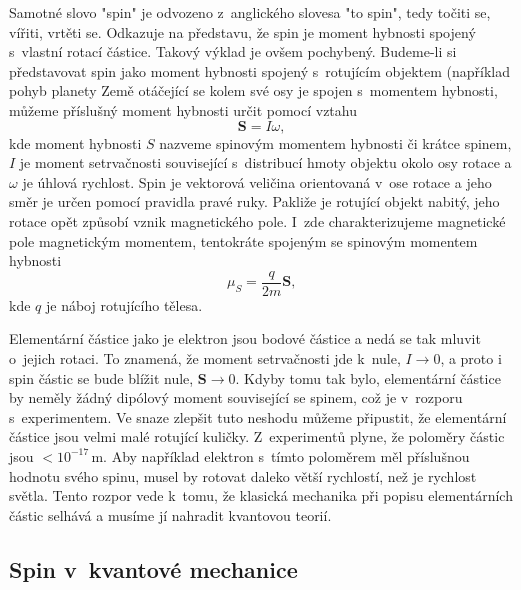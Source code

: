 Samotné slovo "spin" je odvozeno z~anglického slovesa "to spin", tedy točiti se, vířiti, vrtěti se. Odkazuje na představu, že spin je moment hybnosti spojený s~vlastní rotací částice. Takový výklad je ovšem pochybený. Budeme-li si představovat spin jako moment hybnosti spojený s~rotujícím objektem (například pohyb planety Země otáčející se kolem své osy je spojen s~momentem hybnosti, můžeme příslušný moment hybnosti určit pomocí vztahu
\begin{equation}
\mathbf{S} = I \omega \mbox{,}
\label{rov:Spin3}
\end{equation}
kde moment hybnosti  $S$ nazveme spinovým momentem hybnosti či krátce spinem,  $I$ je moment setrvačnosti související s~distribucí hmoty objektu okolo osy rotace a $\omega$ je úhlová rychlost. Spin je vektorová veličina orientovaná v~ose rotace a jeho směr je určen pomocí pravidla pravé ruky. Pakliže je rotující objekt nabitý, jeho rotace opět způsobí vznik magnetického pole. I~zde charakterizujeme magnetické pole magnetickým momentem, tentokráte spojeným se spinovým momentem hybnosti
\begin{equation}
\mu_S = \frac{q}{2m}\mathbf{S} \mbox{,}
\label{rov:Spin4}
\end{equation}
kde $q$ je náboj rotujícího tělesa.

Elementární částice jako je elektron jsou bodové částice a nedá se tak mluvit o~jejich rotaci. To znamená, že moment setrvačnosti jde k~nule, $I \rightarrow 0$, a proto i spin částic se bude blížit nule, $\mathbf{S} \rightarrow 0$. Kdyby tomu tak bylo, elementární částice by neměly žádný dipólový moment související se spinem, což je v~rozporu s~experimentem. Ve snaze zlepšit tuto neshodu můžeme připustit, že elementární částice jsou velmi malé rotující kuličky. Z~experimentů plyne, že poloměry částic jsou $< 10^{-17} \,\mbox{m}$. Aby například elektron s~tímto poloměrem měl příslušnou hodnotu svého spinu, musel by rotovat daleko větší rychlostí, než je rychlost světla. Tento rozpor vede k~tomu, že klasická mechanika při popisu elementárních částic selhává a musíme jí nahradit kvantovou teorií.


\subsection{Spin v~kvantové mechanice}
\label{kap:Spin-QM}

